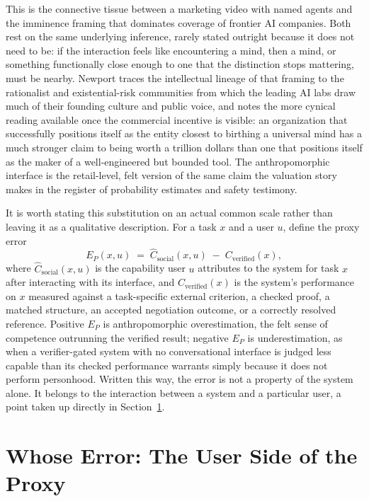 \documentclass[11pt]{article}
\begin{document}
This is the connective tissue between a marketing video with named agents and the imminence framing that dominates coverage of frontier AI companies. Both rest on the same underlying inference, rarely stated outright because it does not need to be: if the interaction feels like encountering a mind, then a mind, or something functionally close enough to one that the distinction stops mattering, must be nearby. Newport traces the intellectual lineage of that framing to the rationalist and existential-risk communities from which the leading AI labs draw much of their founding culture and public voice, and notes the more cynical reading available once the commercial incentive is visible: an organization that successfully positions itself as the entity closest to birthing a universal mind has a much stronger claim to being worth a trillion dollars than one that positions itself as the maker of a well-engineered but bounded tool. The anthropomorphic interface is the retail-level, felt version of the same claim the valuation story makes in the register of probability estimates and safety testimony.

It is worth stating this substitution on an actual common scale rather than leaving it as a qualitative description. For a task $x$ and a user $u$, define the proxy error
\[
E_P(x,u) \;=\; \widehat{C}_{\mathrm{social}}(x,u) \;-\; C_{\mathrm{verified}}(x),
\]
where $\widehat{C}_{\mathrm{social}}(x,u)$ is the capability user $u$ attributes to the system for task $x$ after interacting with its interface, and $C_{\mathrm{verified}}(x)$ is the system's performance on $x$ measured against a task-specific external criterion, a checked proof, a matched structure, an accepted negotiation outcome, or a correctly resolved reference. Positive $E_P$ is anthropomorphic overestimation, the felt sense of competence outrunning the verified result; negative $E_P$ is underestimation, as when a verifier-gated system with no conversational interface is judged less capable than its checked performance warrants simply because it does not perform personhood. Written this way, the error is not a property of the system alone. It belongs to the interaction between a system and a particular user, a point taken up directly in Section~\ref{sec:whose}.

\section{Whose Error: The User Side of the Proxy}
\label{sec:whose}
\end{document}
